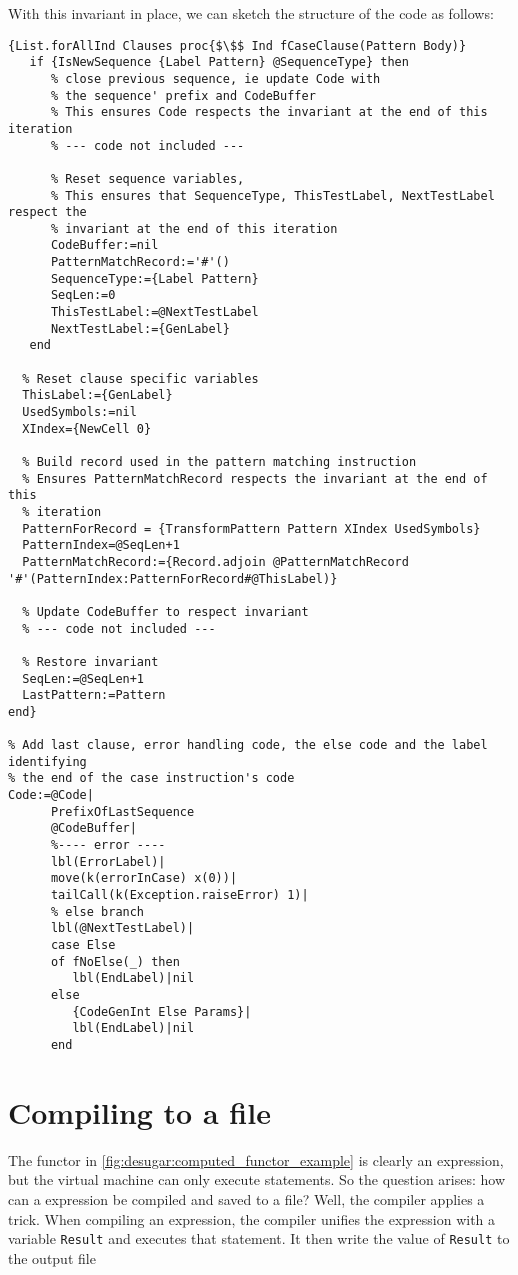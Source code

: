 \documentclass[a4paper]{memoir}
\begin{document}
With this invariant in place, we can sketch the structure of the code as
follows:
\begin{lstlisting}[mathescape]
{List.forAllInd Clauses proc{$\$$ Ind fCaseClause(Pattern Body)}
   if {IsNewSequence {Label Pattern} @SequenceType} then
      % close previous sequence, ie update Code with
      % the sequence' prefix and CodeBuffer
      % This ensures Code respects the invariant at the end of this iteration
      % --- code not included ---

      % Reset sequence variables, 
      % This ensures that SequenceType, ThisTestLabel, NextTestLabel respect the 
      % invariant at the end of this iteration
      CodeBuffer:=nil
      PatternMatchRecord:='#'()
      SequenceType:={Label Pattern}
      SeqLen:=0
      ThisTestLabel:=@NextTestLabel
      NextTestLabel:={GenLabel}
   end

  % Reset clause specific variables 
  ThisLabel:={GenLabel}
  UsedSymbols:=nil
  XIndex={NewCell 0}

  % Build record used in the pattern matching instruction
  % Ensures PatternMatchRecord respects the invariant at the end of this
  % iteration
  PatternForRecord = {TransformPattern Pattern XIndex UsedSymbols}
  PatternIndex=@SeqLen+1
  PatternMatchRecord:={Record.adjoin @PatternMatchRecord '#'(PatternIndex:PatternForRecord#@ThisLabel)}

  % Update CodeBuffer to respect invariant
  % --- code not included ---

  % Restore invariant
  SeqLen:=@SeqLen+1
  LastPattern:=Pattern
end}

% Add last clause, error handling code, the else code and the label identifying
% the end of the case instruction's code
Code:=@Code|
      PrefixOfLastSequence
      @CodeBuffer|
      %---- error ----
      lbl(ErrorLabel)|
      move(k(errorInCase) x(0))|
      tailCall(k(Exception.raiseError) 1)|
      % else branch
      lbl(@NextTestLabel)|
      case Else
      of fNoElse(_) then
         lbl(EndLabel)|nil
      else
         {CodeGenInt Else Params}|
         lbl(EndLabel)|nil
      end
\end{lstlisting}


\section{Compiling to a file}

The functor in \ref{fig:desugar:computed_functor_example} is clearly an
expression, but the virtual machine can only execute statements. So the question
arises: how can a expression be compiled and saved to a file? Well, the compiler 
applies a trick. When compiling an expression, the compiler unifies the
expression with a variable \lstinline!Result! and executes that statement.
It then write the value of \lstinline!Result! to the output file
\end{document}
